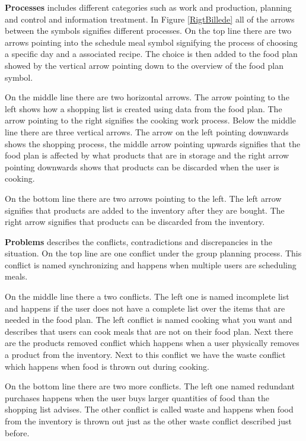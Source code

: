 \textbf{Processes} includes different categories such as work and production, planning and control and information treatment. In Figure \ref{RigtBillede} all of the arrows between the symbols signifies different processes. On the top line there are two arrows pointing into the schedule meal symbol signifying the process of choosing a specific day and a associated recipe. The choice is then added to the food plan showed by the vertical arrow pointing down to the overview of the food plan symbol. 

On the middle line there are two horizontal arrows. The arrow pointing to the left shows how a shopping list is created using data from the food plan. The arrow pointing to the right signifies the cooking work process. Below the middle line there are three vertical arrows. The arrow on the left pointing downwards shows the shopping process, the middle arrow pointing upwards signifies that the food plan is affected by what products that are in storage and the right arrow pointing downwards shows that products can be discarded when the user is cooking. 

On the bottom line there are two arrows pointing to the left. The left arrow signifies that products are added to the inventory after they are bought. The right arrow signifies that products can be discarded from the inventory.            

\textbf{Problems} describes the conflicts, contradictions and discrepancies in the situation. On the top line are one conflict under the group planning process. This conflict is named synchronizing and happens when multiple users are scheduling meals. 

On the middle line there a two conflicts. The left one is named incomplete list and happens if the user does not have a complete list over the items that are needed in the food plan. The left conflict is named cooking what you want and describes that users can cook meals that are not on their food plan. Next there are the products removed conflict which happens when a user physically removes a product from the inventory. Next to this conflict we have the waste conflict which happens when food is thrown out during cooking.  

On the bottom line there are two more conflicts. The left one named redundant purchases happens when the user buys larger quantities of food than the shopping list advises. The other conflict is called waste and happens when food from the inventory is thrown out just as the other waste conflict described just before.           

